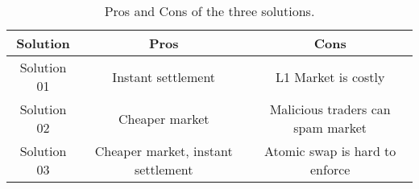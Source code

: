 
\begin{table}[t]
\setlength{\tabcolsep}{0.7\tabcolsep}%

\begin{tabular}{|c|c|c|}


\hline
\multicolumn{1}{|c|}{\textbf{Solution}} & \multicolumn{1}{c|}{\textbf{Pros}}  & \multicolumn{1}{c|}{\textbf{Cons}}                           			\\ \hline

	Solution 01                          & Instant settlement  					&L1 Market is costly						\\ \hline
	Solution 02                            & Cheaper market                       		&Malicious traders can spam market	 		\\ \hline
	Solution 03                             & Cheaper market, instant settlement          &Atomic swap is hard to enforce                                       \\ \hline

\end{tabular}
\caption{Pros and Cons of the three solutions.
\label{tab:proscons}}
\end{table}

